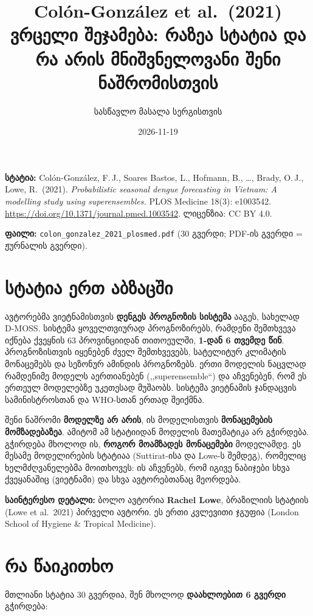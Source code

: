 \documentclass[11pt,a4paper]{article}
\title{Colón-González et al.\ (2021)\\[0.3em]
\large ვრცელი შეჯამება: რაზეა სტატია და რა არის მნიშვნელოვანი შენი ნაშრომისთვის}
\author{სასწავლო მასალა სერგისთვის}
\date{2026-11-19}
\newcommand{\q}[1]{,,#1``}
\begin{document}
\maketitle

\noindent\textbf{სტატია:} Colón-González, F.\,J., Soares Bastos, L., Hofmann, B., \ldots, Brady, O.\,J., Lowe, R.\ (2021).
\emph{Probabilistic seasonal dengue forecasting in Vietnam: A modelling study using superensembles.}
PLOS Medicine 18(3): e1003542. \url{https://doi.org/10.1371/journal.pmed.1003542}. ლიცენზია: CC BY 4.0.

\noindent\textbf{ფაილი:} \texttt{colon\_gonzalez\_2021\_plosmed.pdf} (30 გვერდი; PDF-ის გვერდი = ჟურნალის გვერდი).

\tableofcontents

\section{სტატია ერთ აბზაცში}

ავტორებმა ვიეტნამისთვის \textbf{დენგეს პროგნოზის სისტემა} ააგეს, სახელად D-MOSS. სისტემა ყოველთვიურად
პროგნოზირებს, რამდენი შემთხვევა იქნება ქვეყნის 63 პროვინციიდან თითოეულში, \textbf{1-დან 6 თვემდე წინ}.
პროგნოზისთვის იყენებენ ძველ შემთხვევებს, სატელიტურ კლიმატის მონაცემებს და სეზონურ ამინდის პროგნოზებს.
ერთი მოდელის ნაცვლად რამდენიმე მოდელს აერთიანებენ (\q{superensemble}) და აჩვენებენ, რომ ეს ერთეულ მოდელებზე
უკეთესად მუშაობს. სისტემა ვიეტნამის ჯანდაცვის სამინისტროსთან და WHO-სთან ერთად შეიქმნა.

\begin{mnishvn}
შენი ნაშრომი \textbf{მოდელზე არ არის}, ის მოდელისთვის \textbf{მონაცემების მომზადებაზეა}. ამიტომ ამ სტატიიდან
მოდელის მათემატიკა არ გჭირდება. გჭირდება მხოლოდ ის, \textbf{როგორ მოამზადეს მონაცემები} მოდელამდე.
ეს მესამე მოდელირების სტატიაა (Suttirat-ისა და Lowe-ს შემდეგ), რომელიც ხელმძღვანელებმა მოითხოვეს:
ის აჩვენებს, რომ იგივე ნაბიჯები სხვა ქვეყანაშიც (ვიეტნამი) და სხვა ავტორებთანაც მეორდება.
\end{mnishvn}

\noindent\textbf{საინტერესო დეტალი:} ბოლო ავტორია \textbf{Rachel Lowe}, ბრაზილიის სტატიის (Lowe et al.\ 2021)
პირველი ავტორი. ეს ერთი კვლევითი ჯგუფია (London School of Hygiene \& Tropical Medicine).

\section{რა წაიკითხო}

მთლიანი სტატია 30 გვერდია, შენ მხოლოდ \textbf{დაახლოებით 6 გვერდი} გჭირდება:
\end{document}
